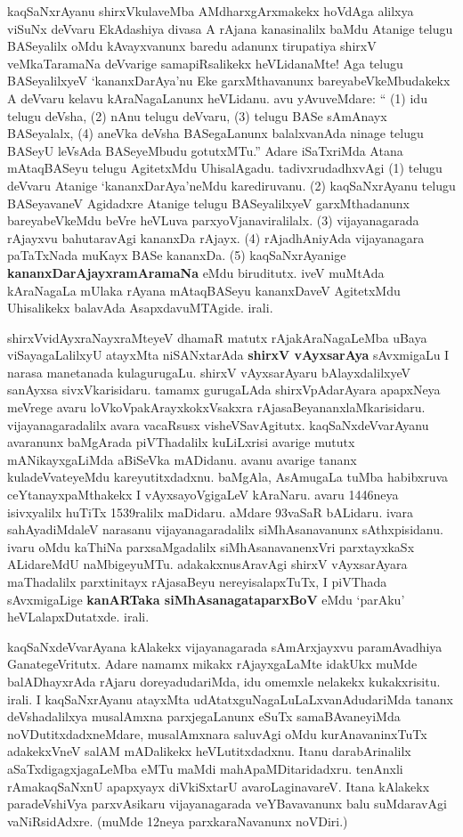 \documentclass[11pt,a4size]{article}
\begin{document}
kaqSaNxrAyanu shirxVkulaveMba AMdharxgArxmakekx hoVdAga alilxya viSuNx
deVvaru EkAdashiya divasa A rAjana kanasinalilx baMdu Atanige telugu
BASeyalilx oMdu kAvayxvanunx baredu adanunx tirupatiya shirxV
veMkaTaramaNa deVvarige samapiRsalikekx heVLidanaMte! Aga telugu
BASeyalilxyeV `kananxDarAya'nu Eke garxMthavanunx
bareyabeVkeMbudakekx A deVvaru kelavu kAraNagaLanunx heVLidanu. avu
yAvuveMdare: `` (1) idu telugu deVsha, (2) nAnu telugu deVvaru, (3)
telugu BASe sAmAnayx BASeyalalx, (4) aneVka deVsha BASegaLanunx
balalxvanAda ninage telugu BASeyU leVsAda BASeyeMbudu gotutxMTu.''
Adare iSaTxriMda Atana mAtaqBASeyu telugu AgitetxMdu
UhisalAgadu. tadivxrudadhxvAgi (1) telugu deVvaru Atanige
`kananxDarAya'neMdu karediruvanu. (2) kaqSaNxrAyanu telugu BASeyavaneV
Agidadxre Atanige telugu BASeyalilxyeV garxMthadanunx bareyabeVkeMdu
beVre heVLuva parxyoVjanaviralilalx. (3) vijayanagarada rAjayxvu
bahutaravAgi kananxDa rAjayx. (4) rAjadhAniyAda vijayanagara
paTaTxNada muKayx BASe kananxDa. (5) kaqSaNxrAyanige
\textbf{kananxDarAjayxramAramaNa} eMdu biruditutx. iveV muMtAda
kAraNagaLa mUlaka rAyana mAtaqBASeyu kananxDaveV AgitetxMdu
Uhisalikekx balavAda AsapxdavuMTAgide. irali.

shirxVvidAyxraNayxraMteyeV
 dhamaR matutx rAjakAraNagaLeMba uBaya
viSayagaLalilxyU atayxMta niSANxtarAda \textbf{shirxV vAyxsarAya}
sAvxmigaLu I narasa manetanada kulagurugaLu. shirxV vAyxsarAyaru
bAlayxdalilxyeV sanAyxsa sivxVkarisidaru. tamamx gurugaLAda
shirxVpAdarAyara apapxNeya meVrege avaru loVkoVpakArayxkokxVsakxra
rAjasaBeyananxlaMkarisidaru. vijayanagaradalilx avara vacaRsusx
visheVSavAgitutx. kaqSaNxdeVvarAyanu avaranunx baMgArada piVThadalilx
kuLiLxrisi avarige mututx mANikayxgaLiMda aBiSeVka mADidanu. avanu
avarige tananx kuladeVvateyeMdu kareyutitxdadxnu. baMgAla, AsAmugaLa
tuMba habibxruva ceYtanayxpaMthakekx I vAyxsayoVgigaLeV
kAraNaru. avaru 1446neya isivxyalilx huTiTx 1539ralilx
maDidaru. aMdare 93vaSaR bALidaru. ivara sahAyadiMdaleV narasanu
vijayanagaradalilx siMhAsanavanunx sAthxpisidanu. ivaru oMdu kaThiNa
parxsaMgadalilx siMhAsanavanenxVri parxtayxkaSx ALidareMdU
naMbigeyuMTu. adakakxnusAravAgi shirxV vAyxsarAyara
 maThadalilx
parxtinitayx rAjasaBeyu nereyisalapxTuTx, I piVThada sAvxmigaLige
\textbf{kanARTaka siMhAsanagataparxBoV} eMdu `parAku'
heVLalapxDutatxde. irali.

kaqSaNxdeVvarAyana kAlakekx vijayanagarada sAmArxjayxvu paramAvadhiya
GanategeVritutx. Adare namamx mikakx rAjayxgaLaMte idakUkx muMde
balADhayxrAda rAjaru doreyadudariMda, idu omemxle nelakekx
kukakxrisitu. irali. I kaqSaNxrAyanu atayxMta
udAtatxguNagaLuLaLxvanAdudariMda tananx deVshadalilxya musalAmxna
parxjegaLanunx eSuTx samaBAvaneyiMda noVDutitxdadxneMdare,
musalAmxnara saluvAgi oMdu kurAnavaninxTuTx adakekxVneV salAM
mADalikekx heVLutitxdadxnu. Itanu darabArinalilx aSaTxdigagxjagaLeMba
eMTu maMdi mahApaMDitaridadxru. tenAnxli rAmakaqSaNxnU apapxyayx
diVkiSxtarU avaroLaginavareV. Itana kAlakekx paradeVshiVya
parxvAsikaru vijayanagarada veYBavavanunx balu suMdaravAgi
vaNiRsidAdxre. (muMde 12neya parxkaraNavanunx noVDiri.)
\end{document}
